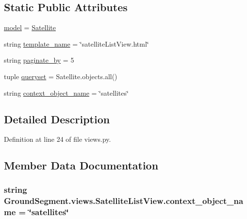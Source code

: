 \subsection*{Static Public Attributes}
\begin{DoxyCompactItemize}
\item 
\hyperlink{class_ground_segment_1_1views_1_1_satellite_list_view_aca49b82a0728d4d774225851f66e6a70}{model} = \hyperlink{class_ground_segment_1_1models_1_1_satellite_1_1_satellite}{Satellite}
\item 
string \hyperlink{class_ground_segment_1_1views_1_1_satellite_list_view_a35e83703976f9b723aebb9b899924d9a}{template\+\_\+name} = \char`\"{}satellite\+List\+View.\+html\char`\"{}
\item 
string \hyperlink{class_ground_segment_1_1views_1_1_satellite_list_view_a611ab80fb5c5c2e75a819efcb5f6c0f8}{paginate\+\_\+by} = \textquotesingle{}5\textquotesingle{}
\item 
tuple \hyperlink{class_ground_segment_1_1views_1_1_satellite_list_view_ae1fb474282cc7cf2bb1497743fcb7b76}{queryset} = Satellite.\+objects.\+all()
\item 
string \hyperlink{class_ground_segment_1_1views_1_1_satellite_list_view_a3dc973a475df29d17ea35ff9acec536f}{context\+\_\+object\+\_\+name} = \char`\"{}satellites\char`\"{}
\end{DoxyCompactItemize}


\subsection{Detailed Description}


Definition at line 24 of file views.\+py.



\subsection{Member Data Documentation}
\hypertarget{class_ground_segment_1_1views_1_1_satellite_list_view_a3dc973a475df29d17ea35ff9acec536f}{}
\subsubsection[{context\+\_\+object\+\_\+name}]{\setlength{\rightskip}{0pt plus 5cm}string Ground\+Segment.\+views.\+Satellite\+List\+View.\+context\+\_\+object\+\_\+name = \char`\"{}satellites\char`\"{}\hspace{0.3cm}{\ttfamily [static]}}\label{class_ground_segment_1_1views_1_1_satellite_list_view_a3dc973a475df29d17ea35ff9acec536f}


